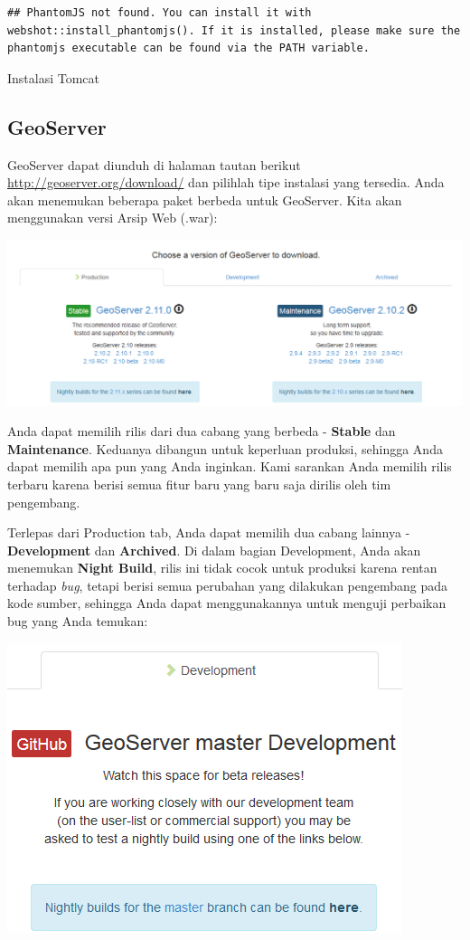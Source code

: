 \documentclass[]{book}
\begin{document}
\begin{verbatim}
## PhantomJS not found. You can install it with webshot::install_phantomjs(). If it is installed, please make sure the phantomjs executable can be found via the PATH variable.
\end{verbatim}

\label{fig:embed1}Instalasi Tomcat

\hypertarget{geoserver-1}{%
\subsection{GeoServer}\label{geoserver-1}}

GeoServer dapat diunduh di halaman tautan berikut \url{http://geoserver.org/download/} dan pilihlah tipe instalasi yang tersedia. Anda akan menemukan beberapa paket berbeda untuk GeoServer. Kita akan menggunakan versi Arsip Web (.war):

\begin{center}\includegraphics[width=0.6\linewidth]{images/07/fig72} \end{center}

Anda dapat memilih rilis dari dua cabang yang berbeda - \textbf{Stable} dan \textbf{Maintenance}. Keduanya dibangun untuk keperluan produksi, sehingga Anda dapat memilih apa pun yang Anda inginkan. Kami sarankan Anda memilih rilis terbaru karena berisi semua fitur baru yang baru saja dirilis oleh tim pengembang.

Terlepas dari Production tab, Anda dapat memilih dua cabang lainnya - \textbf{Development} dan \textbf{Archived}. Di dalam bagian Development, Anda akan menemukan \textbf{Night Build}, rilis ini tidak cocok untuk produksi karena rentan terhadap \emph{bug}, tetapi berisi semua perubahan yang dilakukan pengembang pada kode sumber, sehingga Anda dapat menggunakannya untuk menguji perbaikan bug yang Anda temukan:

\begin{center}\includegraphics[width=0.6\linewidth]{images/07/fig73} \end{center}
\end{document}
